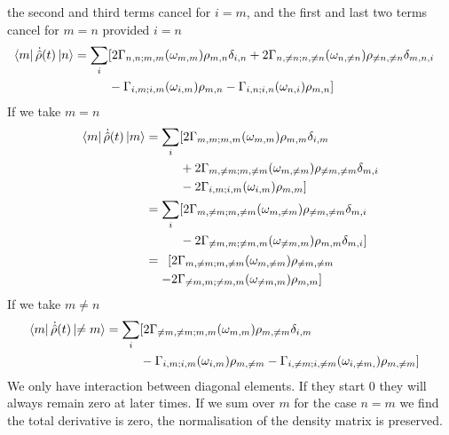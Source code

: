 the second and third terms cancel
for \(i=m\), and the first and
last two terms cancel for \(m=n\)
provided \(i = n\)
\begin{align}
    \bra{m}\dot{\hat{\rho}}(t) \ket{n} & = \begin{aligned}[t]
        \sum_{i} &
        [2 \Gamma_{n,n;m, m}(\omega_{m,m})\rho_{m, n}\delta_{i,n}
        + 2\Gamma_{n,\neq n;n, \neq n}(\omega_{n,\neq n})\rho_{\neq n, \neq n}\delta_{m,n, i} \\
                 &
                - \Gamma_{i,m;i, m}(\omega_{i,m})\rho_{m, n}
                - \Gamma_{ i,n;i,n}(\omega_{n,i})\rho_{m, n}]
    \end{aligned}
\end{align}
If we take \(m=n\)
\begin{align}
    \bra{m}\dot{\hat{\rho}}(t) \ket{m} & = \begin{aligned}[t]
        \sum_{i} &
        [2 \Gamma_{m,m;m, m}(\omega_{m,m})\rho_{m, m}\delta_{i,m}                          \\ &
        + 2\Gamma_{m,\neq m;m, \neq m}(\omega_{m,\neq m})\rho_{\neq m, \neq m}\delta_{m,i} \\
                 &
                - 2 \Gamma_{i,m;i, m}(\omega_{i,m})\rho_{m, m}]
    \end{aligned}                                                 \\
                                       & = \begin{aligned}[t]
        \sum_{i} &
        [2\Gamma_{m,\neq m;m, \neq m}(\omega_{m,\neq m})\rho_{\neq m, \neq m}\delta_{m,i} \\
                 &
                -2 \Gamma_{\neq m,m;\neq m, m}(\omega_{\neq m,m})\rho_{m, m}\delta_{m,i}]
    \end{aligned}                                                 \\
                                       & = \begin{aligned}[t]
        [ & 2\Gamma_{m,\neq m;m, \neq m}(\omega_{m,\neq m})\rho_{\neq m, \neq m} \\
        - & 2\Gamma_{\neq m,m;\neq m, m}(\omega_{\neq m,m})\rho_{m, m}]
    \end{aligned}\label{eqn:cross terms density matrix evolution}
\end{align}
If we take \(m \neq n\)
\begin{align}
    \bra{m}\dot{\hat{\rho}}(t) \ket{\neq m} & = \begin{aligned}[t]
        \sum_{i} &
        [2 \Gamma_{\neq m,\neq m;m, m}(\omega_{m,m})\rho_{m, \neq m}\delta_{i,m} \\
                 &
                - \Gamma_{i,m;i, m}(\omega_{i,m})\rho_{m, \neq m}
                - \Gamma_{ i,\neq m; i, \neq m}(\omega_{i, \neq m,})\rho_{m, \neq m}]
    \end{aligned}
\end{align}
We only have interaction
between diagonal elements.
If they start 0 they will
always remain zero at
later times. If we
sum over \(m\) for the
case \(n=m\) we find
the total derivative is
zero, the normalisation of
the density matrix is preserved.



